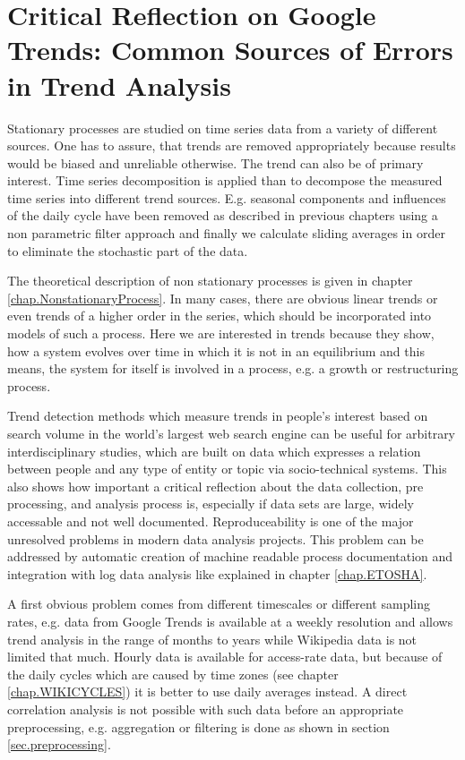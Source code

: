 \documentclass[a4paper,10pt]{scrbook}
\begin{document}
\section{Critical Reflection on Google Trends: Common Sources of Errors in Trend Analysis}
Stationary processes are studied on time series data from a variety of different sources. One has to assure, that trends are removed
appropriately because results would be biased and unreliable otherwise. The trend can also be of primary interest. 
Time series decomposition is applied than to decompose the measured time series into different trend sources. 
E.g. seasonal components and influences of the daily cycle have been removed as described in previous chapters using 
a non parametric filter approach and finally we calculate sliding averages in order to eliminate the stochastic part of the data. 

The theoretical description of non stationary processes is given in chapter \ref{chap.NonstationaryProcess}. In many cases, there are obvious linear trends or even trends of a higher order in the series, which should be incorporated into models of such a process. 
Here we are interested in trends because they show, how a system evolves over time in which it is not in an 
equilibrium and this means, the system for itself is involved in a process, e.g. a growth or restructuring process.

Trend detection methods which measure trends in people's interest based on search volume in the world's largest web search engine
can be useful for arbitrary interdisciplinary studies, which are built on data which expresses a relation between people and 
any type of entity or topic via socio-technical systems. This also shows how important a critical reflection about the data collection, pre processing, and analysis process is, especially if data sets are large, widely accessable and not well documented. Reproduceability is one of the major unresolved problems in modern data analysis projects. This problem can be addressed by automatic creation of machine readable process documentation and integration with log data analysis like explained in chapter \ref{chap.ETOSHA}.     
 
 
 A first obvious problem comes from different timescales or different sampling rates, e.g. data from Google Trends is available at a weekly resolution and allows trend analysis in the range of months to years while Wikipedia data is not limited that much. Hourly data is available for access-rate data, but because of the daily cycles which are caused by time zones (see chapter \ref{chap.WIKICYCLES}) it is better to use daily averages instead. A direct correlation analysis is not possible with such data before an appropriate preprocessing, e.g. aggregation or filtering is done as shown in section \ref{sec.preprocessing}.  
\end{document}
